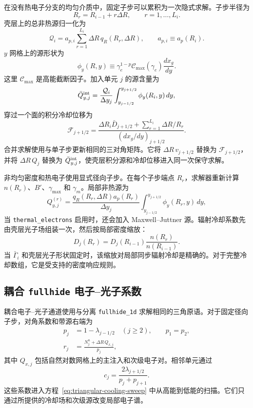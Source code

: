 \documentclass[twocolumn]{aastex702}
\begin{document}
在没有热电子分支的均匀介质中，固定子步可以累积为一次隐式求解。子步半径为
\begin{equation}
R_r=R_{i-1}+r\Delta R,\qquad r=1,\ldots,L_i .
\end{equation}
壳层上的总非热源归一化为
\begin{equation}
\mathcal{Q}_{i}
=a_{p,i}\sum_{r=1}^{L_i}\Delta R\,q_R(R_r,\Delta R),
\qquad a_{p,i}\equiv a_p(R_i).
\end{equation}
\(y\) 网格上的源形状为
\begin{equation}
\phi_y(R,y)\equiv
\gamma_e^{1-p}
\mathcal{C}_{\max}(\gamma_e)
\frac{dx_g}{dy}.
\end{equation}
这里 \(\mathcal{C}_{\max}\) 是高能截断因子。加入单元 \(j\) 的源含量为
\begin{equation}
\bar Q_{y,j}^{\rm int}
=\frac{\mathcal Q_i}{\Delta y_j}
\int_{y_{j-1/2}}^{y_{j+1/2}}\phi_y(R_i,y)\,dy ,
\end{equation}
穿过一个面的积分冷却位移为
\begin{equation}
\mathcal{F}_{j+1/2}=
\frac{\Delta R_i\bar D_{j+1/2}
+\sum_{r=1}^{L_i}\Delta R/R_r}
{(dx_g/dy)_{j+1/2}} .
\end{equation}
合并求解使用与单子步更新相同的三对角矩阵。它将 \(\Delta R\,v_{j+1/2}\) 替换为 \(\mathcal{F}_{j+1/2}\)，并将 \(\Delta R\,Q_j\) 替换为 \(\bar Q_{y,j}^{\rm int}\)，使壳层积分源和冷却位移进入同一次保守求解。

非均匀密度和热电子使用显式径向子步。在每个子步端点 \(R_r\)，求解器重新计算 \(n(R_r)\)、\(B'\)、\(\gamma_{\max}\) 和 \(\gamma_m\)。局部非热源为
\begin{equation}
Q_{y,j}^{(r)}
=\frac{q_R(R_r,\Delta R)a_p(R_r)}{\Delta y_j}
\int_{y_{j-1/2}}^{y_{j+1/2}}\phi_y(R_r,y)\,dy ,
\end{equation}
当 \texttt{thermal\_electrons} 启用时，还会加入 Maxwell--Juttner 源。辐射冷却系数先由壳层光子场组装一次，然后按局部密度缩放：
\begin{equation}
D_j(R_r)=D_j(R_{i-1})\frac{n(R_r)}{n(R_{i-1})}.
\end{equation}
当 \(\bar\Gamma_i\) 和壳层光子形状固定时，该缩放对局部同步辐射冷却是精确的。对于完整冷却数组，它是受支持的密度响应规则。

\subsection{耦合 \texttt{fullhide} 电子--光子系数}

耦合电子--光子通道使用与分离 \texttt{fullhide\_1d} 求解相同的三角原语。对于固定径向子步，对角系数和带源右端为
\begin{equation}
\begin{aligned}
p_j&=1-\lambda_{j-1/2}\quad (j\ge2),\qquad p_1=p_2,\\
r_j&=\frac{N_j^n+\Delta R\,Q_{x,j}}{p_j},
\end{aligned}
\end{equation}
其中 \(Q_{x,j}\) 包括自然对数网格上的主注入和次级电子对。相邻单元通过
\begin{equation}
c_j=\frac{2\lambda_{j+1/2}}{p_j+p_{j+1}} .
\end{equation}
这些系数进入方程~\eqref{eq:triangular-cooling-sweep} 中从高能到低能的扫描。它们只通过所提供的冷却场和次级源改变局部电子谱。
\end{document}
